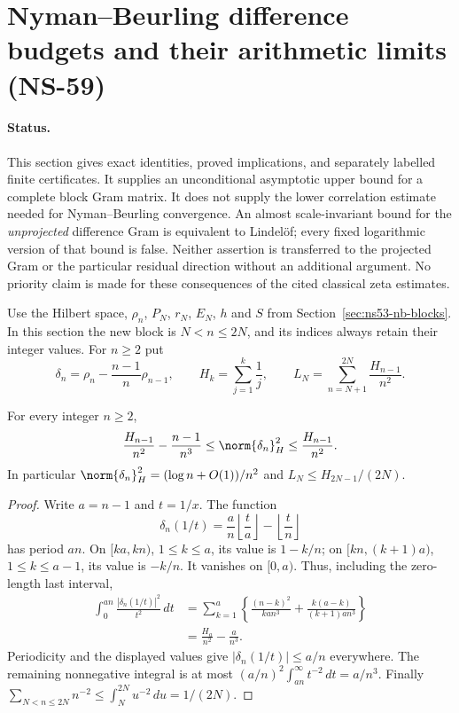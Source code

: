\section{Nyman--Beurling difference budgets and their arithmetic limits (NS-59)}
\label{sec:v158-nb-difference}

\paragraph{Status.}
This section gives exact identities, proved implications, and separately
labelled finite certificates. It supplies an unconditional asymptotic upper
bound for a complete block Gram matrix. It does not supply the lower
correlation estimate needed for Nyman--Beurling convergence. An almost
scale-invariant bound for the \emph{unprojected} difference Gram is equivalent
to Lindel\"of; every fixed logarithmic version of that bound is false.
Neither assertion is transferred to the projected Gram or the particular
residual direction without an additional argument. No priority claim is made
for these consequences of the cited classical zeta estimates.

Use the Hilbert space, $\rho_n$, $P_N$, $r_N$, $E_N$, $h$ and $S$ from
Section~\ref{sec:ns53-nb-blocks}. In this section the new block is
$N<n\leq 2N$, and its indices always retain their integer values.
For $n\geq2$ put
\begin{equation}
 \delta_n=\rho_n-\frac{n-1}{n}\rho_{n-1},\qquad
 H_k=\sum_{j=1}^k\frac1j,\qquad
 L_N=\sum_{n=N+1}^{2N}\frac{H_{n-1}}{n^2}.
 \label{eq:v158-difference-def}
\end{equation}

\begin{proposition}
\label{prop:v158-adjacent-budget}
For every integer $n\geq2$,
\begin{equation}
 \frac{H_{n-1}}{n^2}-\frac{n-1}{n^3}
 \leq \norm{\delta_n}_H^2
 \leq\frac{H_{n-1}}{n^2}.
 \label{eq:v158-adjacent-norm}
\end{equation}
In particular $\norm{\delta_n}_H^2=(\log n+O(1))/n^2$ and
$L_N\leq H_{2N-1}/(2N)$.
\end{proposition}
\begin{proof}
Write $a=n-1$ and $t=1/x$. The function
\[
 \delta_n(1/t)=\frac{a}{n}\left\lfloor\frac{t}{a}\right\rfloor
              -\left\lfloor\frac{t}{n}\right\rfloor
\]
has period $an$. On $[ka,kn)$, $1\leq k\leq a$, its value is
$1-k/n$; on $[kn,(k+1)a)$, $1\leq k\leq a-1$, its value is $-k/n$.
It vanishes on $[0,a)$. Thus, including the zero-length last interval,
\begin{align*}
 \int_0^{an}\frac{|\delta_n(1/t)|^2}{t^2}\,dt
 &=\sum_{k=1}^a\left\{
 \frac{(n-k)^2}{k a n^3}
 +\frac{k(a-k)}{(k+1)a n^3}\right\}\\
 &=\frac{H_a}{n^2}-\frac{a}{n^3}.
\end{align*}
Periodicity and the displayed values give $|\delta_n(1/t)|\leq a/n$ everywhere.
The remaining nonnegative integral is at most
$(a/n)^2\int_{an}^{\infty}t^{-2}\,dt=a/n^3$.
Finally $\sum_{N<n\leq2N}n^{-2}\leq\int_N^{2N}u^{-2}\,du=1/(2N)$.
\end{proof}

